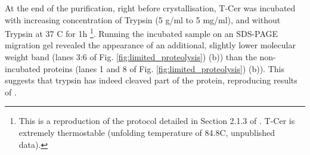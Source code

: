 At the end of the purification, right before crystallisation, T-Cer was incubated with increasing concentration of Trypsin (5 \textmu g/ml to 5 mg/ml), and without Trypsin at 37 \degree C for 1h \footnote{This is a reproduction of the protocol detailed in Section 2.1.3 of \cite{aumonierTimeresolvedMonochromaticSynchrotron2019}. T-Cer is extremely thermostable (unfolding temperature of 84.8\degree C, unpublished data).}.  Running the incubated sample on an SDS-PAGE migration gel revealed the appearance of an additional, slightly lower molecular weight band (lanes 3:6 of Fig. \ref{fig:limited_proteolysis}) (b)) than the non-incubated proteins (lanes 1 and 8 of Fig. \ref{fig:limited_proteolysis}) (b)). This suggests that trypsin has indeed cleaved part of the protein, reproducing results of \cite{aumonierTimeresolvedMonochromaticSynchrotron2019}. 

